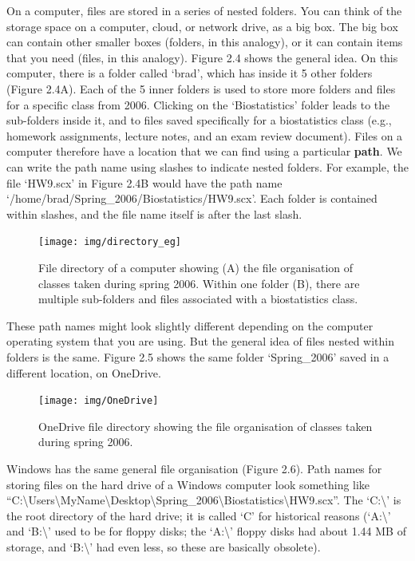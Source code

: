 \documentclass[
  openany]{krantz}
\begin{document}
On a computer, files are stored in a series of nested folders.
You can think of the storage space on a computer, cloud, or network drive, as a big box.
The big box can contain other smaller boxes (folders, in this analogy), or it can contain items that you need (files, in this analogy).
Figure 2.4 shows the general idea.
On this computer, there is a folder called `brad', which has inside it 5 other folders (Figure 2.4A).
Each of the 5 inner folders is used to store more folders and files for a specific class from 2006.
Clicking on the `Biostatistics' folder leads to the sub-folders inside it, and to files saved specifically for a biostatistics class (e.g., homework assignments, lecture notes, and an exam review document).
Files on a computer therefore have a location that we can find using a particular \textbf{path}.
We can write the path name using slashes to indicate nested folders.
For example, the file `HW9.scx' in Figure 2.4B would have the path name `/home/brad/Spring\_2006/Biostatistics/HW9.scx'.
Each folder is contained within slashes, and the file name itself is after the last slash.

\begin{figure}
\texttt{[image: img/directory\_eg]} \caption{File directory of a computer showing (A) the file organisation of classes taken during spring 2006. Within one folder (B), there are multiple sub-folders and files associated with a biostatistics class.}\label{fig:unnamed-chunk-6}
\end{figure}

These path names might look slightly different depending on the computer operating system that you are using.
But the general idea of files nested within folders is the same.
Figure 2.5 shows the same folder `Spring\_2006' saved in a different location, on OneDrive.

\begin{figure}
\texttt{[image: img/OneDrive]} \caption{OneDrive file directory showing the file organisation of classes taken during spring 2006.}\label{fig:unnamed-chunk-7}
\end{figure}

Windows has the same general file organisation (Figure 2.6).
Path names for storing files on the hard drive of a Windows computer look something like ``C:\textbackslash Users\textbackslash MyName\textbackslash Desktop\textbackslash Spring\_2006\textbackslash Biostatistics\textbackslash HW9.scx''.
The `C:\textbackslash{}' is the root directory of the hard drive; it is called `C' for historical reasons (`A:\textbackslash{}' and `B:\textbackslash{}' used to be for floppy disks; the `A:\textbackslash{}' floppy disks had about 1.44 MB of storage, and `B:\textbackslash{}' had even less, so these are basically obsolete).
\end{document}
